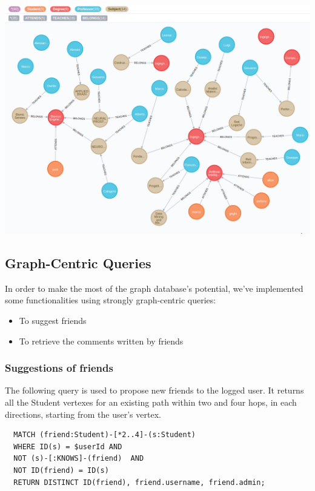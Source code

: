 \documentclass[a4paper]{article}
\begin{document}
\begin{minipage}{\linewidth}
\begin{center}
\vspace{4mm}
\includegraphics[width = 1\textwidth]{./images/diagrams/graphDb.png} 
\vspace{2mm}
\label{fig:analisys_diagram}
\end{center}
\end{minipage}
\clearpage
\subsection{Graph-Centric Queries}
In order to make the most of the graph database's potential, we've implemented some functionalities using strongly graph-centric queries:
\begin{itemize}
\item To suggest friends
\item To retrieve the comments written by friends
\end{itemize}

\subsubsection{Suggestions of friends}
The following query is used to propose new friends to the logged user. It returns all the Student vertexes for an existing path within two and four hops, in each directions, starting from the user's vertex.
\begin{verbatim}
  MATCH (friend:Student)-[*2..4]-(s:Student) 
  WHERE ID(s) = $userId AND  
  NOT (s)-[:KNOWS]-(friend)  AND
  NOT ID(friend) = ID(s) 
  RETURN DISTINCT ID(friend), friend.username, friend.admin;
\end{verbatim}
\end{document}
